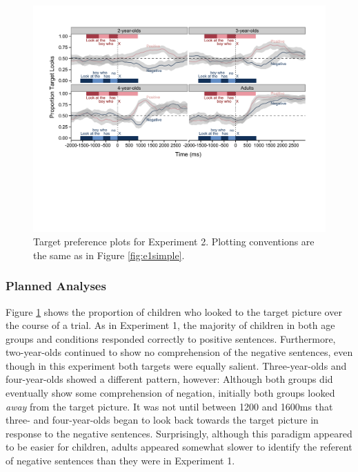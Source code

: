 \documentclass[man]{apa2}
\begin{document}
\begin{figure}
\begin{center} 
\includegraphics[width=6in]{simpleplots_something.pdf}
\caption{\label{fig:e2simple} Target preference plots for Experiment 2. Plotting conventions are the same as in Figure \ref{fig:e1simple}.}
\end{center} 
\end{figure}

\subsubsection{Planned Analyses}
Figure \ref{fig:e2simple} shows the proportion of children who looked to the target picture over the course of a trial.  As in Experiment 1, the majority of children in both age groups and conditions responded correctly to positive sentences.  Furthermore, two-year-olds continued to show no comprehension of the negative sentences, even though in this experiment both targets were equally salient.  Three-year-olds and four-year-olds showed a different pattern, however: Although both groups did eventually show some comprehension of negation, initially both groups looked \emph{away} from the target picture.  It was not until between 1200 and 1600ms that three- and four-year-olds began to look back towards the target picture in response to the negative sentences. Surprisingly, although this paradigm appeared to be easier for children, adults appeared somewhat slower to identify the referent of negative sentences than they were in Experiment 1.  
\end{document}
